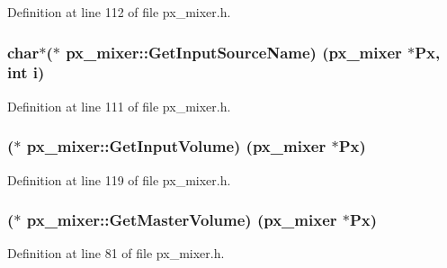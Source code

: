 Definition at line 112 of file px\+\_\+mixer.\+h.

\subsubsection[{\texorpdfstring{Get\+Input\+Source\+Name}{GetInputSourceName}}]{ char$\ast$($\ast$ px\+\_\+mixer\+::\+Get\+Input\+Source\+Name) ({\bf px\+\_\+mixer} $\ast$Px, {\bf int} {\bf i})}\hypertarget{structpx__mixer_a6baf21f3d35d6fa5b2d3a66dd63f3a62}{}\label{structpx__mixer_a6baf21f3d35d6fa5b2d3a66dd63f3a62}


Definition at line 111 of file px\+\_\+mixer.\+h.

\subsubsection[{\texorpdfstring{Get\+Input\+Volume}{GetInputVolume}}]{($\ast$ px\+\_\+mixer\+::\+Get\+Input\+Volume) ({\bf px\+\_\+mixer} $\ast$Px)}\hypertarget{structpx__mixer_a1826ede8dc391816105919490a6ea529}{}\label{structpx__mixer_a1826ede8dc391816105919490a6ea529}


Definition at line 119 of file px\+\_\+mixer.\+h.

\subsubsection[{\texorpdfstring{Get\+Master\+Volume}{GetMasterVolume}}]{($\ast$ px\+\_\+mixer\+::\+Get\+Master\+Volume) ({\bf px\+\_\+mixer} $\ast$Px)}\hypertarget{structpx__mixer_a12d44993a8d09ae8b24242728da9ffa9}{}\label{structpx__mixer_a12d44993a8d09ae8b24242728da9ffa9}


Definition at line 81 of file px\+\_\+mixer.\+h.


